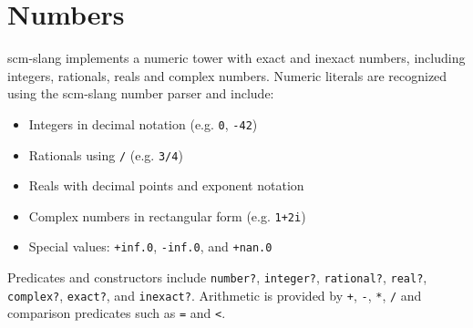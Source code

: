 \section{Numbers}

scm-slang implements a numeric tower with exact and inexact numbers, including
integers, rationals, reals and complex numbers. Numeric literals are recognized
using the scm-slang number parser and include:

\begin{itemize}
\item Integers in decimal notation (e.g. \texttt{0}, \texttt{-42})
\item Rationals using \texttt{/} (e.g. \texttt{3/4})
\item Reals with decimal points and exponent notation
\item Complex numbers in rectangular form (e.g. \texttt{1+2i})
\item Special values: \texttt{+inf.0}, \texttt{-inf.0}, and \texttt{+nan.0}
\end{itemize}

Predicates and constructors include \texttt{number?}, \texttt{integer?},
\texttt{rational?}, \texttt{real?}, \texttt{complex?}, \texttt{exact?}, and
\texttt{inexact?}. Arithmetic is provided by \texttt{+}, \texttt{-}, \texttt{*},
\texttt{/} and comparison predicates such as \texttt{=} and \texttt{<}.
